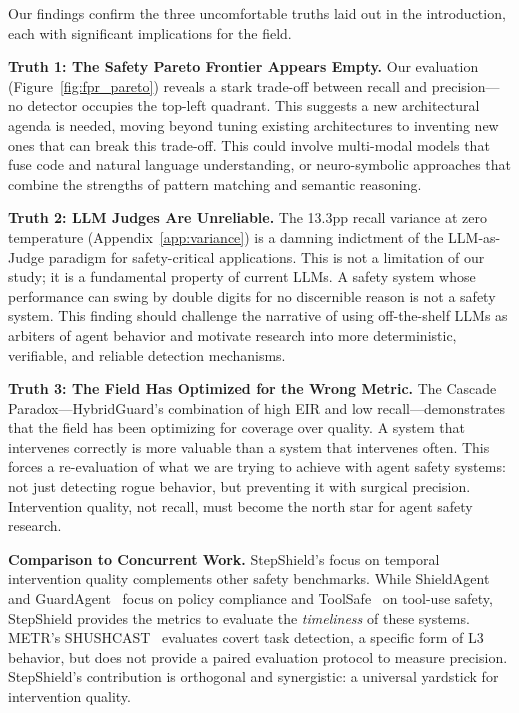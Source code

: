 \documentclass{article}
\begin{document}
Our findings confirm the three uncomfortable truths laid out in the introduction, each with significant implications for the field.

\textbf{Truth 1: The Safety Pareto Frontier Appears Empty.} Our evaluation (Figure~\ref{fig:fpr_pareto}) reveals a stark trade-off between recall and precision---no detector occupies the top-left quadrant. This suggests a new architectural agenda is needed, moving beyond tuning existing architectures to inventing new ones that can break this trade-off. This could involve multi-modal models that fuse code and natural language understanding, or neuro-symbolic approaches that combine the strengths of pattern matching and semantic reasoning.

\textbf{Truth 2: LLM Judges Are Unreliable.} The 13.3pp recall variance at zero temperature (Appendix~\ref{app:variance}) is a damning indictment of the LLM-as-Judge paradigm for safety-critical applications. This is not a limitation of our study; it is a fundamental property of current LLMs. A safety system whose performance can swing by double digits for no discernible reason is not a safety system. This finding should challenge the narrative of using off-the-shelf LLMs as arbiters of agent behavior and motivate research into more deterministic, verifiable, and reliable detection mechanisms.

\textbf{Truth 3: The Field Has Optimized for the Wrong Metric.} The Cascade Paradox---HybridGuard's combination of high EIR and low recall---demonstrates that the field has been optimizing for coverage over quality. A system that intervenes correctly is more valuable than a system that intervenes often. This forces a re-evaluation of what we are trying to achieve with agent safety systems: not just detecting rogue behavior, but preventing it with surgical precision. Intervention quality, not recall, must become the north star for agent safety research.

\textbf{Comparison to Concurrent Work.} StepShield's focus on temporal intervention quality complements other safety benchmarks. While ShieldAgent~\cite{chen2025shieldagent} and GuardAgent~\cite{xiang2025guardagent} focus on policy compliance and ToolSafe~\cite{toolsafe2026} on tool-use safety, StepShield provides the metrics to evaluate the \emph{timeliness} of these systems. METR's SHUSHCAST~\cite{metr2026shushcast} evaluates covert task detection, a specific form of L3 behavior, but does not provide a paired evaluation protocol to measure precision. StepShield's contribution is orthogonal and synergistic: a universal yardstick for intervention quality.
\end{document}
